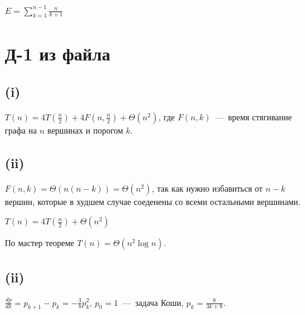 \documentclass[a4paper,12pt]{article} %
\begin{document}
$E=\sum\limits_{k=1}^{n-1}\frac{n}{k+1}$

\section{Д-1 из файла}
\subsection{(i)}
\hspace{5mm}
$T(n)=4T(\frac{n}{2})+4F(n,\frac{n}{2})+\Theta(n^2)$, где $F(n,k)$~---~время стягивание графа на $n$ вершинах и порогом $k$.

\subsection{(ii)}
\hspace{5mm}
$F(n,k)=\Theta(n(n-k))=\Theta(n^2)$, так как нужно избавиться от  $n-k$ вершин, которые в худшем случае соеденены со всеми остальными вершинами.

$T(n)=4T(\frac{n}{2})+\Theta(n^2)$

По мастер теореме $T(n)=\Theta(n^2\log{n})$.

\subsection{(ii)}
\hspace{5mm}
$\frac{dp}{dk}=p_{k+1}-p_k=-\frac{3}{8}p_k^2$, $p_0=1$~---~задача Коши, $p_k=\frac{8}{3k+8}$.
\end{document}
